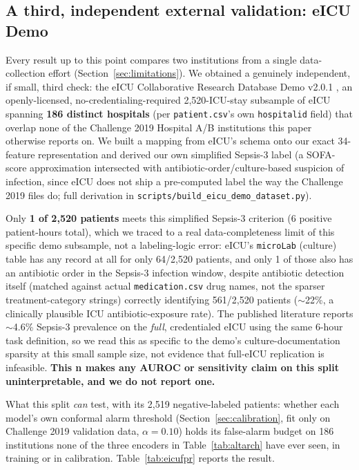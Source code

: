 \documentclass[11pt]{article}
\begin{document}
\subsection{A third, independent external validation: eICU Demo}
\label{sec:eicu}
Every result up to this point compares two institutions from a single data-collection effort (Section~\ref{sec:limitations}). We obtained a genuinely independent, if small, third check: the eICU Collaborative Research Database Demo v2.0.1 \citep{pollard2018eicu}, an openly-licensed, no-credentialing-required 2{,}520-ICU-stay subsample of eICU spanning \textbf{186 distinct hospitals} (per \texttt{patient.csv}'s own \texttt{hospitalid} field) that overlap none of the Challenge 2019 Hospital A/B institutions this paper otherwise reports on. We built a mapping from eICU's schema onto our exact 34-feature representation and derived our own simplified Sepsis-3 label (a SOFA-score approximation intersected with antibiotic-order/culture-based suspicion of infection, since eICU does not ship a pre-computed label the way the Challenge 2019 files do; full derivation in \texttt{scripts/build\_eicu\_demo\_dataset.py}).

Only \textbf{1 of 2{,}520 patients} meets this simplified Sepsis-3 criterion (6 positive patient-hours total), which we traced to a real data-completeness limit of this specific demo subsample, not a labeling-logic error: eICU's \texttt{microLab} (culture) table has any record at all for only 64/2{,}520 patients, and only 1 of those also has an antibiotic order in the Sepsis-3 infection window, despite antibiotic detection itself (matched against actual \texttt{medication.csv} drug names, not the sparser treatment-category strings) correctly identifying 561/2{,}520 patients ($\sim$22\%, a clinically plausible ICU antibiotic-exposure rate). The published literature reports $\sim$4.6\% Sepsis-3 prevalence on the \emph{full}, credentialed eICU using the same 6-hour task definition, so we read this as specific to the demo's culture-documentation sparsity at this small sample size, not evidence that full-eICU replication is infeasible. \textbf{This n makes any AUROC or sensitivity claim on this split uninterpretable, and we do not report one.}

What this split \emph{can} test, with its 2{,}519 negative-labeled patients: whether each model's own conformal alarm threshold (Section~\ref{sec:calibration}, fit only on Challenge 2019 validation data, $\alpha=0.10$) holds its false-alarm budget on 186 institutions none of the three encoders in Table~\ref{tab:altarch} have ever seen, in training or in calibration. Table~\ref{tab:eicufpr} reports the result.
\end{document}

